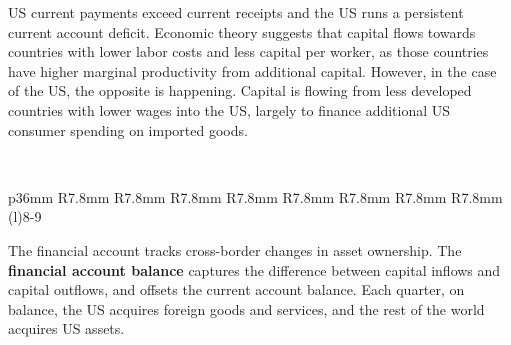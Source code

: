\begin{minipage}{0.76\textwidth}
\vspace{1mm}

\small US current payments exceed current receipts and the US runs a persistent current account deficit. Economic theory suggests that capital flows towards countries with lower labor costs and less capital per worker, as those countries have higher marginal productivity from additional capital. However, in the case of the US, the opposite is happening. Capital is flowing from less developed countries with lower wages into the US, largely to finance additional US consumer spending on imported goods. 
\end{minipage}
\newpage
{}
\begin{minipage}{0.76\textwidth}
\\
 \setlength{\tabcolsep}{3.5pt} \color{black!90}
	{\renewcommand{\arraystretch}{1.55}
	\begin{tabular}{p{36mm} R{7.8mm} R{7.8mm} R{7.8mm} R{7.8mm} R{7.8mm}
		   R{7.8mm} R{7.8mm} R{7.8mm} }
	\cmidrule(l){8-9}\addlinespace[-0.8mm]	   
	 \hline
	\end{tabular}}\vspace{-1.5mm}
		
\vspace{4mm}

\small The financial account tracks cross-border changes in asset ownership. The \textbf{financial account balance} captures the difference between capital inflows and capital outflows, and offsets the current account balance. Each quarter, on balance, the US acquires foreign goods and services, and the rest of the world acquires US assets. 

 
\vspace{1mm}

\vspace{4.4cm}

\hspace*{5mm} 


\end{minipage}
